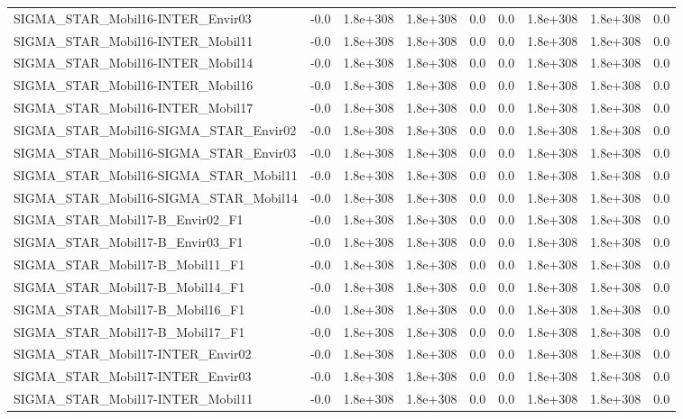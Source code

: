 \begin{tabular}{lrrrrrrrr}
SIGMA_STAR_Mobil16-INTER_Envir03 & -0.0 & 1.8e+308 & 1.8e+308 & 0.0 & 0.0 & 1.8e+308 & 1.8e+308 & 0.0 \\
SIGMA_STAR_Mobil16-INTER_Mobil11 & -0.0 & 1.8e+308 & 1.8e+308 & 0.0 & 0.0 & 1.8e+308 & 1.8e+308 & 0.0 \\
SIGMA_STAR_Mobil16-INTER_Mobil14 & -0.0 & 1.8e+308 & 1.8e+308 & 0.0 & 0.0 & 1.8e+308 & 1.8e+308 & 0.0 \\
SIGMA_STAR_Mobil16-INTER_Mobil16 & -0.0 & 1.8e+308 & 1.8e+308 & 0.0 & 0.0 & 1.8e+308 & 1.8e+308 & 0.0 \\
SIGMA_STAR_Mobil16-INTER_Mobil17 & -0.0 & 1.8e+308 & 1.8e+308 & 0.0 & 0.0 & 1.8e+308 & 1.8e+308 & 0.0 \\
SIGMA_STAR_Mobil16-SIGMA_STAR_Envir02 & -0.0 & 1.8e+308 & 1.8e+308 & 0.0 & 0.0 & 1.8e+308 & 1.8e+308 & 0.0 \\
SIGMA_STAR_Mobil16-SIGMA_STAR_Envir03 & -0.0 & 1.8e+308 & 1.8e+308 & 0.0 & 0.0 & 1.8e+308 & 1.8e+308 & 0.0 \\
SIGMA_STAR_Mobil16-SIGMA_STAR_Mobil11 & -0.0 & 1.8e+308 & 1.8e+308 & 0.0 & 0.0 & 1.8e+308 & 1.8e+308 & 0.0 \\
SIGMA_STAR_Mobil16-SIGMA_STAR_Mobil14 & -0.0 & 1.8e+308 & 1.8e+308 & 0.0 & 0.0 & 1.8e+308 & 1.8e+308 & 0.0 \\
SIGMA_STAR_Mobil17-B_Envir02_F1 & -0.0 & 1.8e+308 & 1.8e+308 & 0.0 & 0.0 & 1.8e+308 & 1.8e+308 & 0.0 \\
SIGMA_STAR_Mobil17-B_Envir03_F1 & -0.0 & 1.8e+308 & 1.8e+308 & 0.0 & 0.0 & 1.8e+308 & 1.8e+308 & 0.0 \\
SIGMA_STAR_Mobil17-B_Mobil11_F1 & -0.0 & 1.8e+308 & 1.8e+308 & 0.0 & 0.0 & 1.8e+308 & 1.8e+308 & 0.0 \\
SIGMA_STAR_Mobil17-B_Mobil14_F1 & -0.0 & 1.8e+308 & 1.8e+308 & 0.0 & 0.0 & 1.8e+308 & 1.8e+308 & 0.0 \\
SIGMA_STAR_Mobil17-B_Mobil16_F1 & -0.0 & 1.8e+308 & 1.8e+308 & 0.0 & 0.0 & 1.8e+308 & 1.8e+308 & 0.0 \\
SIGMA_STAR_Mobil17-B_Mobil17_F1 & -0.0 & 1.8e+308 & 1.8e+308 & 0.0 & 0.0 & 1.8e+308 & 1.8e+308 & 0.0 \\
SIGMA_STAR_Mobil17-INTER_Envir02 & -0.0 & 1.8e+308 & 1.8e+308 & 0.0 & 0.0 & 1.8e+308 & 1.8e+308 & 0.0 \\
SIGMA_STAR_Mobil17-INTER_Envir03 & -0.0 & 1.8e+308 & 1.8e+308 & 0.0 & 0.0 & 1.8e+308 & 1.8e+308 & 0.0 \\
SIGMA_STAR_Mobil17-INTER_Mobil11 & -0.0 & 1.8e+308 & 1.8e+308 & 0.0 & 0.0 & 1.8e+308 & 1.8e+308 & 0.0 \\

\end{tabular}
